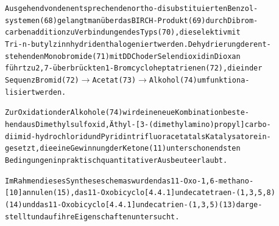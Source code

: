 \documentclass[a4paper,11pt]{article}
\begin{document}
\begin{alltt}

Ausgehend von den entsprechenden ortho-disubstituierten Benzol-
systemen (68) gelangt man über das BIRCH-Produkt (69) durch Dibrom-
carbenaddition zu Verbindungen des Typs (70), die selektiv mit
Tri-n-butylzinnhydrid enthalogeniert werden. Dehydrierung der ent-
stehenden Monobromide (71) mit DDCh oder Selendioxid in Dioxan
führt zu 2,7-überbrückten 1-Bromcycloheptatrienen (72), die in der
Sequenz Bromid (72) \(\longrightarrow\) Acetat (73) \(\longrightarrow\) Alkohol (74) umfunktiona-
lisiert werden.

Zur Oxidation der Alkohole (74) wird eine neue Kombination beste-
hend aus Dimethylsulfoxid, Äthyl-[3-(dimethylamino)propyl]carbo-
diimid-hydrochlorid und Pyridintrifluoracetat als Katalysator ein-
gesetzt, die eine Gewinnung der Ketone (11) unter schonendsten
Bedingungen in praktisch quantitativer Ausbeute erlaubt.

\newpage
{}


Im Rahmen dieses Syntheseschemas wurden das 11-Oxo-1,6-methano-
[10]annulen (15), das 11-Oxobicyclo[4.4.1]undecatetraen-(1‚3,5,8)
(14) und das 11-Oxobicyclo[4.4.1]undecatrien-(1‚3,5) (13) darge-
stellt und auf ihre Eigenschaften untersucht.

\end{alltt}
\hspace{0.5cm}
\hspace{0.75cm}
\hspace{0.75cm}
\chemnameinit{}
\end{document}
